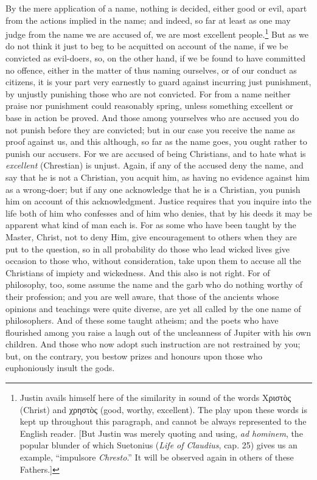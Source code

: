 By the mere application of a name, nothing is decided, either good or evil, apart from the actions implied in the name; and indeed, so far at least as one may judge from the name we are accused of, we are most excellent people.\footnote{Justin avails himself here of the similarity in sound of the words \textgreek{Χριστὸς} (Christ) and \textgreek{χρηστὸς} (good, worthy, excellent). The play upon these words is kept up throughout this paragraph, and cannot be always represented to the English reader. [But Justin was merely quoting and using, \emph{ad hominem}, the popular blunder of which Suetonius (\emph{Life of Claudius}, cap. 25) gives us an example, “impulsore \emph{Chresto}.” It will be observed again in others of these Fathers.]} But  as we do not think it just to beg to be acquitted on account of the name, if we be convicted as evil-doers, so, on the other hand, if we be found to have committed no offence, either in the matter of thus naming ourselves, or of our conduct as citizens, it is your part very earnestly to guard against incurring just punishment, by unjustly punishing those who are not convicted. For from a name neither praise nor punishment could reasonably spring, unless something excellent or base in action be proved. And those among yourselves who are accused you do not punish before they are convicted; but in our case you receive the name as proof against us, and this although, so far as the name goes, you ought rather to punish our accusers. For we are accused of being Christians, and to hate what is \emph{excellent} (Chrestian) is unjust. Again, if any of the accused deny the name, and say that he is not a Christian, you acquit him, as having no evidence against him as a wrong-doer; but if any one acknowledge that he is a Christian, you punish him on account of this acknowledgment. Justice requires that you inquire into the life both of him who confesses and of him who denies, that by his deeds it may be apparent what kind of man each is. For as some who have been taught by the Master, Christ, not to deny Him, give encouragement to others when they are put to the question, so in all probability do those who lead wicked lives give occasion to those who, without consideration, take upon them to accuse all the Christians of impiety and wickedness. And this also is not right. For of philosophy, too, some assume the name and the garb who do nothing worthy of their profession; and you are well aware, that those of the ancients whose opinions and teachings were quite diverse, are yet all called by the one name of philosophers. And of these some taught atheism; and the poets who have flourished among you raise a laugh out of the uncleanness of Jupiter with his own children. And those who now adopt such instruction are not restrained by you; but, on the contrary, you bestow prizes and honours upon those who euphoniously insult the gods.

